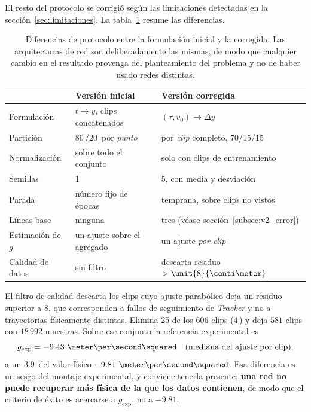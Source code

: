 \documentclass[titlepage,11pt]{article}
\providecommand{\num}[1]{\ensuremath{#1}}
\providecommand{\SI}[2]{#1\,#2}
\providecommand{\percent}{\char37\relax}
\begin{document}
El resto del protocolo se corrigió según las limitaciones detectadas en la
sección~\ref{sec:limitaciones}. La tabla~\ref{tab:v1v2} resume las diferencias.

\begin{table}[H]
  \centering
  \begin{tabular}{lll}
    \toprule
    & Versión inicial & Versión corregida \\
    \midrule
    Formulación   & $t\to y$, clips concatenados & $(\tau,v_0)\to\Delta y$ \\
    Partición     & \SI{80}{\percent}/\SI{20}{\percent} por \emph{punto}
                  & por \emph{clip} completo, 70/15/15 \\
    Normalización & sobre todo el conjunto & solo con clips de entrenamiento \\
    Semillas      & 1 & 5, con media y desviación \\
    Parada        & número fijo de épocas & temprana, sobre clips no vistos \\
    Líneas base   & ninguna & tres (véase sección~\ref{subsec:v2_error}) \\
    Estimación de $g$ & un ajuste sobre el agregado & un ajuste \emph{por clip} \\
    Calidad de datos & sin filtro & descarta residuo $>\unit{8}{\centi\meter}$ \\
    \bottomrule
  \end{tabular}
  \caption{Diferencias de protocolo entre la formulación inicial y la
    corregida. Las arquitecturas de red son deliberadamente las mismas, de modo
    que cualquier cambio en el resultado provenga del planteamiento del
    problema y no de haber usado redes distintas.}
  \label{tab:v1v2}
\end{table}

El filtro de calidad descarta los clips cuyo ajuste parabólico deja un residuo
superior a \unit{8}{\centi\meter}, que corresponden a fallos de seguimiento de
\emph{Tracker} y no a trayectorias físicamente distintas. Elimina 25 de los 606
clips (\SI{4}{\percent}) y deja \num{581} clips con \num{18\,992} muestras. Sobre
ese conjunto la referencia experimental es
\begin{equation}
  g_{\text{exp}} = \num{-9.43}~\meter\per\second\squared \quad
  \text{(mediana del ajuste por clip)},
\end{equation}
a un \SI{3.9}{\percent} del valor físico $\num{-9.81}~\meter\per\second\squared$.
Esa diferencia es un sesgo del montaje experimental, y conviene tenerla presente:
\textbf{una red no puede recuperar más física de la que los datos contienen}, de
modo que el criterio de éxito es acercarse a $g_{\text{exp}}$, no a
$\num{-9.81}$.
\end{document}
